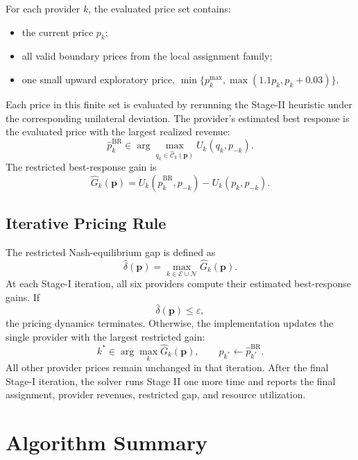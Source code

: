 \documentclass[11pt]{article}
\begin{document}
For each provider \(k\), the evaluated price set contains:
\begin{itemize}
    \item the current price \(p_k\);
    \item all valid boundary prices from the local assignment family;
    \item one small upward exploratory price, \(\min\{p_k^{\max},\max(1.1p_k,p_k+0.03)\}\).
\end{itemize}
Each price in this finite set is evaluated by rerunning the Stage-II heuristic
under the corresponding unilateral deviation.  The provider's estimated best
response is the evaluated price with the largest realized revenue:
\begin{equation}
    \widehat p_k^{\mathrm{BR}}
    \in
    \arg\max_{q_k\in\widehat{\mathcal C}_k(\boldsymbol p)}
    U_k(q_k,p_{-k}).
    \label{eq:multi-provider-br}
\end{equation}
The restricted best-response gain is
\begin{equation}
    \widehat G_k(\boldsymbol p)
    =
    U_k(\widehat p_k^{\mathrm{BR}},p_{-k})-U_k(p_k,p_{-k}).
    \label{eq:multi-provider-gain}
\end{equation}

\subsection{Iterative Pricing Rule}

The restricted Nash-equilibrium gap is defined as
\begin{equation}
    \widehat\delta(\boldsymbol p)
    =
    \max_{k\in\mathcal E\cup\mathcal N}\widehat G_k(\boldsymbol p).
    \label{eq:multi-provider-restricted-gap}
\end{equation}
At each Stage-I iteration, all six providers compute their estimated
best-response gains.  If
\[
    \widehat\delta(\boldsymbol p)\le \varepsilon,
\]
the pricing dynamics terminates.  Otherwise, the implementation updates the
single provider with the largest restricted gain:
\[
    k^* \in \arg\max_k \widehat G_k(\boldsymbol p),
    \qquad
    p_{k^*}\leftarrow \widehat p_{k^*}^{\mathrm{BR}}.
\]
All other provider prices remain unchanged in that iteration.  After the final
Stage-I iteration, the solver runs Stage II one more time and reports the final
assignment, provider revenues, restricted gap, and resource utilization.

\section{Algorithm Summary}
\end{document}
